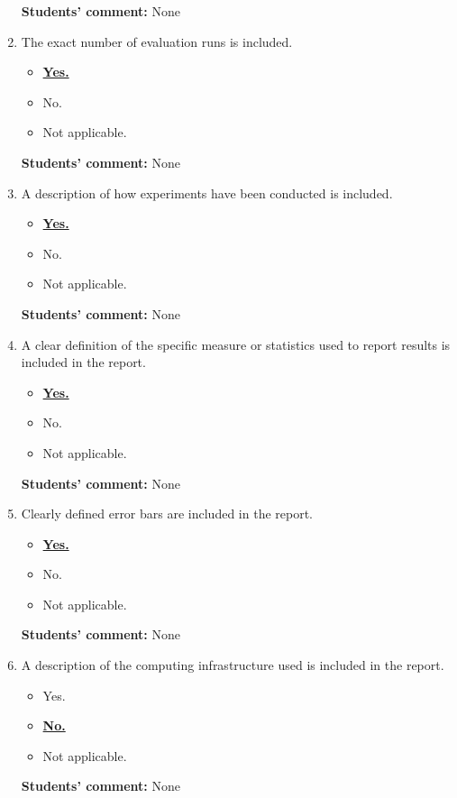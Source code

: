 \documentclass{article}
\begin{document}
\begin{enumerate}
    \textbf{Students' comment:} None
    
    \item The exact number of evaluation runs is included.
    \begin{itemize}
        \item [\faSquareO] \textbf{\underline{Yes.}}
        \item [\faSquareO] No.
        \item [\faSquareO] Not applicable.
    \end{itemize}
    
    \textbf{Students' comment:} None
    
    \item A description of how experiments have been conducted is included.
    \begin{itemize}
        \item [\faSquareO] \textbf{\underline{Yes.}}
        \item [\faSquareO] No.
        \item [\faSquareO] Not applicable.
    \end{itemize}
    
    \textbf{Students' comment:} None
    
    \item A clear definition of the specific measure or statistics used to report results is included in the report.
    \begin{itemize}
        \item [\faSquareO] \textbf{\underline{Yes.}}
        \item [\faSquareO] No.
        \item [\faSquareO] Not applicable.
    \end{itemize}
    
    \textbf{Students' comment:} None
    
    \item Clearly defined error bars are included in the report.
    \begin{itemize}
        \item [\faSquareO] \textbf{\underline{Yes.}}
        \item [\faSquareO] No.
        \item [\faSquareO] Not applicable.
    \end{itemize}
    
    \textbf{Students' comment:} None
    
    \item A description of the computing infrastructure used is included in the report.
    \begin{itemize}
        \item [\faSquareO] Yes.
        \item [\faSquareO] \textbf{\underline{No.}}
        \item [\faSquareO] Not applicable.
    \end{itemize}
    
    \textbf{Students' comment:} None
\end{enumerate}
\end{document}
